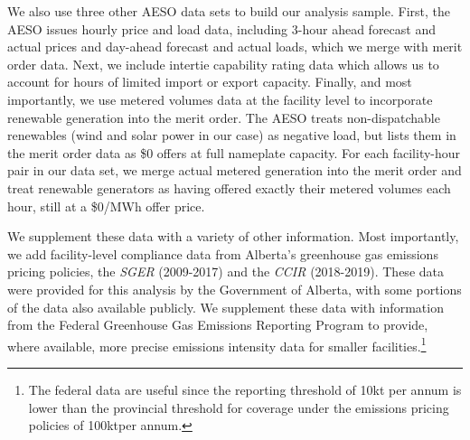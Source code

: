 \documentclass[12pt]{article}
\newcommand{\SGER}{\textit{SGER} }
\newcommand{\CCIR}{\textit{CCIR} }
\newcommand{\coe}{\text{CO$_2$e }}
\begin{document}
We also use three other AESO data sets to build our analysis sample. First, the AESO issues hourly price and load data, including 3-hour ahead forecast and actual prices and day-ahead forecast and actual loads, which we merge with merit order data. Next, we include intertie capability rating data which allows us to account for hours of limited import or export capacity. Finally, and most importantly, we use metered volumes data at the facility level to incorporate renewable generation into the merit order. The AESO treats non-dispatchable renewables (wind and solar power in our case) as negative load, but lists them in the merit order data as \$0 offers at full nameplate capacity. For each facility-hour pair in our data set, we merge actual metered generation into the merit order and treat renewable generators as having offered exactly their metered volumes each hour, still at a \$0/MWh offer price.

We supplement these data with a variety of other information.  Most importantly, we add facility-level compliance data from Alberta's greenhouse gas emissions pricing policies, the \SGER (2009-2017) and the \CCIR (2018-2019). These data were provided for this analysis by the Government of Alberta, with some portions of the data also available publicly. We supplement these data with information from the Federal Greenhouse Gas Emissions Reporting Program to provide, where available, more precise emissions intensity data for smaller facilities.\footnote{The federal data are useful since the reporting threshold of 10kt \coe per annum is lower than the provincial threshold for coverage under the emissions pricing policies of 100kt\coe per annum.}
\end{document}
